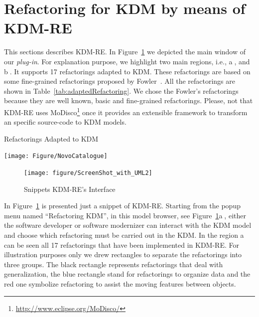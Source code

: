 \documentclass[12pt]{article}
\let\cite=\citep
\begin{document}

\section{Refactoring for KDM by means of KDM-RE}\label{sec:refactoring_kdm_kdm_re}

This sections describes KDM-RE. 
In Figure~\ref{fig:interface} we depicted the main window of our \textit{plug-in}. 
For explanation purpose, we highlight two main regions, i.e., \textcircled{a}, and \textcircled{b}.
It supports 17 refactorings adapted to KDM. These refactorings are based on some fine-grained refactorings proposed by Fowler~\cite{refactImpro}. All the refactorings are shown in Table~\ref{tab:adaptedRefactoring}. We chose the Fowler's refactorings because they are well known, basic and fine-grained refactorings. Please, not that KDM-RE uses MoDisco\footnote{\url{http://www.eclipse.org/MoDisco/}} once it provides an extensible framework to transform an specific source-code to KDM models.%
%
\begin{table}[!h]
\caption{Refactorings Adapted to KDM}
\label{tab:adaptedRefactoring}
\centering
  \texttt{[image: Figure/NovoCatalogue]}
\end{table}
%
\begin{figure}[!ht]
\centering
  \texttt{[image: figure/ScreenShot\_with\_UML2]}
\caption{Snippets KDM-RE's Interface}
\label{fig:interface}
\end{figure}
%
In Figure~\ref{fig:interface} is presented just a snippet of KDM-RE. Starting from the popup menu named ``Refactoring KDM'', in this model browser, see Figure~\ref{fig:interface}\textcircled{a}, either the software developer or software modernizer can interact with the KDM model and choose which refactoring must be carried out in the KDM.
%
In the region \textcircled{a} can be seen all 17 refactorings that have been implemented in KDM-RE. 
For illustration purposes only we drew rectangles to separate the refactorings into three groups. 
The black rectangle represents refactorings that deal with generalization, the blue rectangle stand for refactorings to organize data and the red one symbolize refactoring to assist the moving features between objects.
\end{document}
